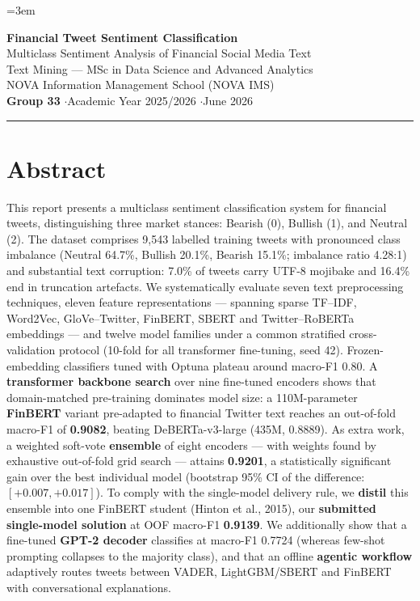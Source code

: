 \documentclass[11pt,a4paper]{article}
\newcommand{\distf}{0.9139}    %
\begin{document}
\emergencystretch=3em
\hfuzz=1pt

\thispagestyle{fancy}
\begin{center}
  {\LARGE\bfseries\color{maincolor} Financial Tweet Sentiment Classification}\\[3pt]
  {\large\color{darkgray} Multiclass Sentiment Analysis of Financial Social Media Text}\\[8pt]
  {\normalsize Text Mining --- MSc in Data Science and Advanced Analytics}\\[1pt]
  {\normalsize NOVA Information Management School (NOVA IMS)}\\[5pt]
  {\normalsize \textbf{Group 33} \quad$\cdot$\quad Academic Year 2025/2026 \quad$\cdot$\quad June 2026}
\end{center}
\vspace{2pt}
{\color{maincolor}\rule{\linewidth}{0.6pt}}
\vspace{4pt}

\section*{Abstract}
This report presents a multiclass sentiment classification system for financial tweets,
distinguishing three market stances: Bearish (0), Bullish (1), and Neutral (2). The dataset
comprises 9{,}543 labelled training tweets with pronounced class imbalance (Neutral 64.7\%,
Bullish 20.1\%, Bearish 15.1\%; imbalance ratio 4.28:1) and substantial text corruption: 7.0\% of
tweets carry UTF-8 mojibake and 16.4\% end in truncation artefacts. We systematically evaluate
seven text preprocessing techniques, eleven feature representations --- spanning sparse TF--IDF,
Word2Vec, GloVe--Twitter, FinBERT, SBERT and Twitter--RoBERTa embeddings --- and twelve model
families under a common stratified cross-validation protocol (10-fold for all transformer
fine-tuning, seed 42). Frozen-embedding classifiers tuned with Optuna plateau around macro-F1 0.80.
A \textbf{transformer backbone search} over nine fine-tuned encoders shows that domain-matched
pre-training dominates model size: a 110M-parameter \textbf{FinBERT} variant pre-adapted to
financial Twitter text reaches an out-of-fold macro-F1 of \textbf{0.9082}, beating DeBERTa-v3-large
(435M, 0.8889). As extra work, a weighted soft-vote \textbf{ensemble} of eight encoders --- with
weights found by exhaustive out-of-fold grid search --- attains \textbf{0.9201}, a statistically
significant gain over the best individual model (bootstrap 95\% CI of the difference:
$[+0.007, +0.017]$). To comply with the single-model delivery rule, we \textbf{distil} this
ensemble into one FinBERT student (Hinton et al., 2015), our \textbf{submitted single-model
solution} at OOF macro-F1 \textbf{\distf}. We additionally show that a fine-tuned \textbf{GPT-2
decoder} classifies at macro-F1 0.7724 (whereas few-shot prompting collapses to the majority
class), and that an offline \textbf{agentic workflow} adaptively routes tweets between VADER,
LightGBM/SBERT and FinBERT with conversational explanations.
\end{document}
